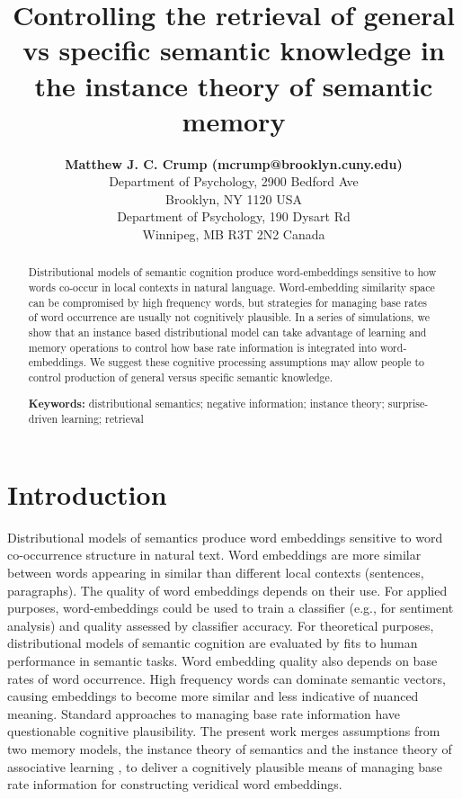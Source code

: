 \documentclass[10pt,letterpaper]{article}
\title{Controlling the retrieval of general vs specific semantic knowledge in the instance theory of semantic memory}
\author{{\large \bf Matthew J. C. Crump (mcrump@brooklyn.cuny.edu)} \\
  Department of Psychology, 2900 Bedford Ave \\
  Brooklyn, NY 1120 USA
  \AND {\large \bf Randall K. Jamieson (randy.jamieson@umanitoba.ca)} \\
  Department of Psychology, 190 Dysart Rd \\
  Winnipeg, MB R3T 2N2 Canada}
\begin{document}
\maketitle


\begin{abstract}
Distributional models of semantic cognition produce word-embeddings sensitive to how words co-occur in local contexts in natural language. Word-embedding similarity space can be compromised by high frequency words, but strategies for managing base rates of word occurrence are usually not cognitively plausible. In a series of simulations, we show that an instance based distributional model \cite<ITS, >{jamiesonInstanceTheorySemantic2018a} can take advantage of learning and memory operations to control how base rate information is integrated into word-embeddings. We suggest these cognitive processing assumptions may allow people to control production of general versus specific semantic knowledge.

\textbf{Keywords:}
distributional semantics; negative information; instance theory; surprise-driven learning; retrieval
\end{abstract}


\section{Introduction}\label{introduction}

Distributional models of semantics produce word embeddings sensitive to word co-occurrence structure in natural text. Word embeddings are more similar between words appearing in similar than different local contexts (sentences, paragraphs). The quality of word embeddings depends on their use. For applied purposes, word-embeddings could be used to train a classifier (e.g., for sentiment analysis) and quality assessed by classifier accuracy. For theoretical purposes, distributional models of semantic cognition are evaluated by fits to human performance in semantic tasks. Word embedding quality also depends on base rates of word occurrence. High frequency words can dominate semantic vectors, causing embeddings to become more similar and less indicative of nuanced meaning. Standard approaches to managing base rate information have questionable cognitive plausibility. The present work merges assumptions from two memory models, the instance theory of semantics \cite<ITS,>{jamiesonInstanceTheorySemantic2018a} and the instance theory of associative learning \cite<MINERVA-AL,>{jamiesonInstanceTheoryAssociative2012}, to deliver a cognitively plausible means of managing base rate information for constructing veridical word embeddings.
\end{document}
